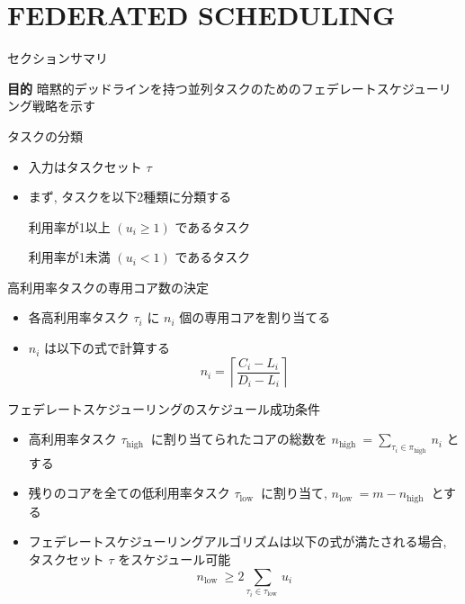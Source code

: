 
\section{FEDERATED SCHEDULING}
\label{sec: federated scheduling}

\begin{frame}{セクションサマリ}
    \begin{itembox}[l]{\textbf{目的}}
        暗黙的デッドラインを持つ並列タスクのためのフェデレートスケジューリング戦略を示す
    \end{itembox}
\end{frame}

\begin{frame}{タスクの分類}
    \begin{itemize}
        \item 入力はタスクセット $\tau$
        \item まず, タスクを以下2種類に分類する
              \begin{definition}
                  利用率が1以上 $\left(u_{i} \geq 1\right)$ であるタスク
              \end{definition}
              \begin{definition}
                  利用率が1未満 $\left(u_{i} < 1\right)$ であるタスク
              \end{definition}
    \end{itemize}
\end{frame}

\begin{frame}{高利用率タスクの専用コア数の決定}
    \begin{itemize}
        \item 各高利用率タスク $\tau_i$ に $n_{i}$ 個の専用コアを割り当てる
        \item $n_{i}$ は以下の式で計算する
              \begin{equation*}
                  n_{i}=\left\lceil\frac{C_{i}-L_{i}}{D_{i}-L_{i}}\right\rceil
              \end{equation*}
    \end{itemize}
\end{frame}

\begin{frame}{フェデレートスケジューリングのスケジュール成功条件}
    \begin{itemize}
        \item 高利用率タスク $\tau_{\text {high }}$ に割り当てられたコアの総数を $n_{\text {high }}=\sum_{\tau_{i} \in \pi_{\text {high }}} n_{i}$ とする
        \item 残りのコアを全ての低利用率タスク $\tau_{\text {low }}$ に割り当て, $n_{\text {low }}=m-n_{\text {high }}$ とする
        \item フェデレートスケジューリングアルゴリズムは以下の式が満たされる場合, タスクセット $\tau$ をスケジュール可能
              \[
                  n_{\text {low }} \geq 2 \sum_{\tau_{i} \in \tau_{\text {low }}} u_{i}
              \]
    \end{itemize}
\end{frame}

